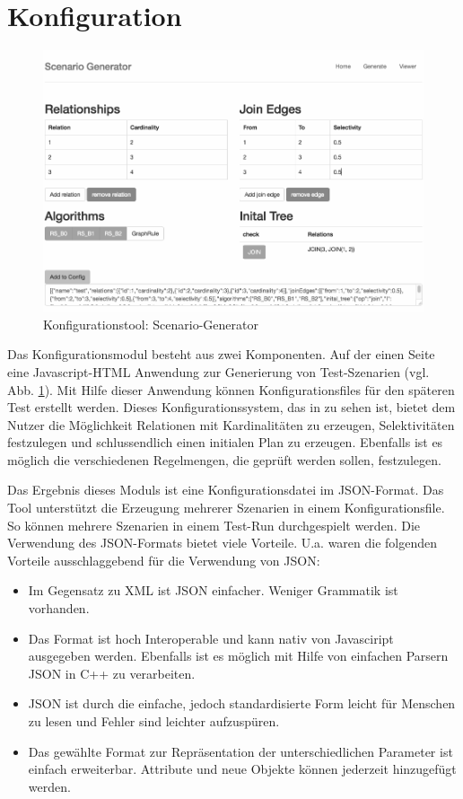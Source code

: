 \section{Konfiguration}


\begin{figure}[ht]
  \centering
  \includegraphics[width=1\textwidth]{04_Implementierung/00_media/Tool.png}
  \caption{Konfigurationstool: Scenario-Generator}
  \label{ScenarioGenerator}
\end{figure}

Das Konfigurationsmodul besteht aus zwei Komponenten. Auf der einen Seite eine Javascript-HTML Anwendung zur Generierung von Test-Szenarien (vgl. Abb. \ref{ScenarioGenerator}). Mit Hilfe dieser Anwendung können Konfigurationsfiles für den späteren Test erstellt werden. Dieses Konfigurationssystem, das in  zu sehen ist, bietet dem Nutzer die Möglichkeit Relationen mit Kardinalitäten zu erzeugen, Selektivitäten festzulegen und schlussendlich einen initialen Plan zu erzeugen. Ebenfalls ist es möglich die verschiedenen Regelmengen, die geprüft werden sollen, festzulegen.

Das Ergebnis dieses Moduls ist eine Konfigurationsdatei im JSON-Format. Das Tool unterstützt die Erzeugung mehrerer Szenarien in einem Konfigurationsfile. So können mehrere Szenarien in einem Test-Run durchgespielt werden. Die Verwendung des JSON-Formats bietet viele Vorteile. U.a. waren die folgenden Vorteile ausschlaggebend für die Verwendung von JSON:

\begin{itemize}
\item Im Gegensatz zu XML ist JSON einfacher. Weniger Grammatik ist vorhanden.
\item Das Format ist hoch Interoperable und kann nativ von Javasciript ausgegeben werden. Ebenfalls ist es möglich mit Hilfe von einfachen Parsern JSON in C++ zu verarbeiten.
\item JSON ist durch die einfache, jedoch standardisierte Form leicht für Menschen zu lesen und Fehler sind leichter aufzuspüren.
\item Das gewählte Format zur Repräsentation der unterschiedlichen Parameter ist einfach erweiterbar. Attribute und neue Objekte können jederzeit hinzugefügt werden.
\end{itemize}

